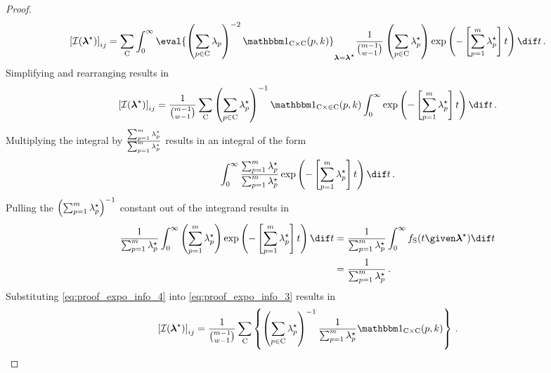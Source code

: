 \documentclass[../main.tex]{subfiles}
\begin{document}
\begin{proof}
\begin{equation}
    \left [ \infomatrx(\tparam{\vec\lambda}) \right ]_{i j} =
    \sum_{\cand}
    \int_{0}^{\infty}
    \eval{
        \left ( \sum_{p \in \cand} \lambda_p \right )^{-2} \SetIndicator{\cand \times \cand}(p,k)
    }_{\vec\lambda = \vec{\tparam\lambda}}
    \frac{1}{\binom{m-1}{w-1}}
    \left ( \sum_{p \in \cand} \tparam\lambda_p \right ) \exp \left ( - \left [ \sum_{p=1}^{m} \tparam\lambda_p \right ] t \right )
     \dif t\,.
\end{equation}
Simplifying and rearranging results in
\begin{equation}
\label{eq:proof_expo_info_3}
    \left [ \infomatrx(\tparam{\vec\lambda}) \right ]_{i j} =
    \frac{1}{\binom{m-1}{w-1}}
    \sum_{\cand}
    \left ( \sum_{p \in \cand} \tparam\lambda_p \right )^{-1}
    \SetIndicator{\cand \times \in \cand}(p,k)
    \int_{0}^{\infty}
    \exp \left ( - \left [ \sum_{p=1}^{m} \tparam\lambda_p \right ] t \right ) 
     \dif t\,.
\end{equation}
Multiplying the integral by $\frac{\sum_{p=1}^{m} {\lambda}^{\star}_p}{\sum_{p=1}^{m} {\lambda}^{\star}_p}$ results in an integral of the form
\begin{equation}
    \int_{0}^{\infty} \frac{\sum_{p=1}^{m} \tparam\lambda_p}{\sum_{p=1}^{m} \tparam\lambda_p} \exp \left ( - \left [ \sum_{p=1}^{m} \tparam\lambda_p \right ] t \right ) 
     \dif t\,.
\end{equation}
Pulling the $\left(\sum_{p=1}^{m} {\lambda}^{\star}_p\right)^{-1}$ constant out of the integrand results in
\begin{align}
    \frac{1}{\sum_{p=1}^{m} \tparam\lambda_p} \int_{0}^{\infty}
    \left ( \sum_{p=1}^{m} \tparam\lambda_p \right ) \exp \left ( - \left [ \sum_{p=1}^{m} \tparam\lambda_p \right ] t \right ) \dif t
    &= \frac{1}{\sum_{p=1}^{m} \tparam\lambda_p} \int_{0}^{\infty}
    \spdf(t \given \tparam{\vec\lambda}) \dif t\\
\label{eq:proof_expo_info_4}
    &= \frac{1}{\sum_{p=1}^{m} \tparam\lambda_p}\,.
\end{align}
Substituting \cref{eq:proof_expo_info_4} into \cref{eq:proof_expo_info_3} results in
\begin{equation}
\label{eq:proof_expo_info_5}
    \left [ \infomatrx(\tparam{\vec\lambda}) \right ]_{i j} =
    \frac{1}{\binom{m-1}{w-1}}
    \sum_{\cand} \left\{
    \left ( \sum_{p \in \cand} \tparam\lambda_p \right )^{-1}
    \frac{1}{\sum_{p=1}^{m} \tparam\lambda_p} \SetIndicator{\cand \times \cand}(p,k) \right \}\,.
\end{equation}
\end{proof}
\end{document}
